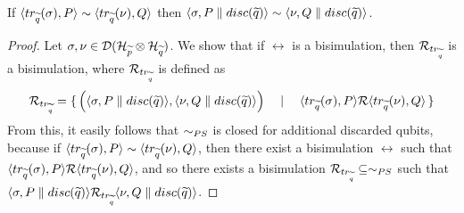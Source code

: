 \begin{theorem}\label{bisim_closed_by_discard}
If $\langle tr_{\widetilde{q}}(\sigma), P\rangle \sim \langle tr_{\widetilde{q}}(\nu), Q\rangle$ then $\langle\sigma, P \parallel disc(\widetilde{q})\rangle \sim \langle\nu, Q \parallel disc(\widetilde{q})\rangle$.
\end{theorem}
\newcommand{\relTrQ}{\rel_{\trQ}}
\begin{proof} 
Let $\sigma, \nu \in \mathcal{D}(\mathcal{H}_{\widetilde{p}} \otimes \mathcal{H}_{\widetilde{q}})$. We show that if $\rel$ is a bisimulation, then $\mathcal{R}_{tr_{\widetilde{q}}}$ is a bisimulation, where $\mathcal{R}_{tr_{\widetilde{q}}}$ is defined as
\[\mathcal{R}_{tr_{\widetilde{q}}} = \set{\Big(\langle\sigma, P \parallel disc(\widetilde{q})\rangle, \langle\nu, Q \parallel disc(\widetilde{q})\rangle\Big) \quad\mid\quad \langle tr_{\widetilde{q}}(\sigma), P\rangle \mathcal{R}\langle tr_{\widetilde{q}}(\nu), Q\rangle}\]
From this, it easily follows that $\sim_{PS}$ is closed for additional discarded qubits, because if $\langle tr_{\widetilde{q}}(\sigma), P\rangle \sim \langle tr_{\widetilde{q}}(\nu), Q\rangle$, then there exist a bisimulation $\rel$ such that $\langle tr_{\widetilde{q}}(\sigma), P\rangle \mathcal{R} \langle tr_{\widetilde{q}}(\nu), Q\rangle$, and so there exists a bisimulation $\relTrQ \subseteq \simps$ such that $\confw{\sigma, P \parallel \discQ} \relTrQ \confw{\nu, Q \parallel \discQ}$.


\end{proof}
